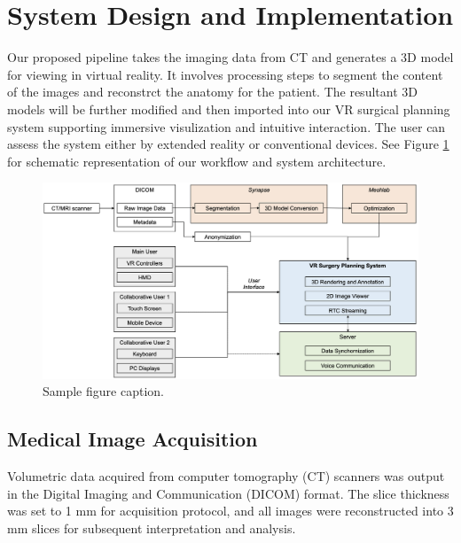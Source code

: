 \documentclass{bmcart}
\begin{document}
\section{System Design and Implementation}
Our proposed pipeline takes the imaging data from CT and generates a 3D model for viewing in virtual reality. It involves processing steps to segment the content of the images and reconstrct the anatomy for the patient. The resultant 3D models will be further modified and then imported into our VR surgical planning system supporting immersive visulization and intuitive interaction. The user can assess the system either by extended reality or conventional devices. See Figure \ref{fig:Scheme} for schematic representation of our workflow and system architecture.



\begin{figure}
  \centering
  \includegraphics[width=.9\linewidth]{../Media/Scheme}  
  \caption{Sample figure caption.}
  \label{fig:Scheme}
\end{figure}

\subsection{Medical Image Acquisition}
Volumetric data acquired from computer tomography (CT) scanners was output in the Digital Imaging and Communication (DICOM) format. The slice thickness was set to 1 mm for acquisition protocol, and all images were reconstructed into 3 mm slices for subsequent interpretation and analysis.
\end{document}
